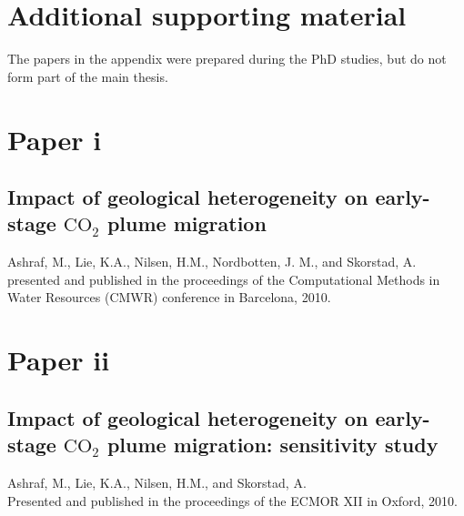 \chapter{Additional supporting material}
\label{appendixA}
\pagebreak
The papers in the appendix were prepared during the PhD studies, but do not form part of the main thesis.

\pagebreak

\chapter*{Paper i}


\section{Impact of geological heterogeneity on early-stage $\mbox{CO}_2$ plume
migration}\label{paperi}

\noindent Ashraf, M., Lie, K.A., Nilsen, H.M., Nordbotten, J. M., and
Skorstad, A.\\

\noindent presented and published in the proceedings of the Computational Methods in Water Resources
(CMWR) conference in Barcelona, 2010.
\cleardoublepage



\pagebreak

\chapter*{Paper ii}


\section{Impact of geological heterogeneity on early-stage $\mbox{CO}_2$ plume
migration: sensitivity study}\label{paperii}

\noindent Ashraf, M., Lie, K.A., Nilsen, H.M., and
Skorstad, A.\\

\noindent Presented and published in the proceedings of the ECMOR XII in Oxford, 2010.
\cleardoublepage



